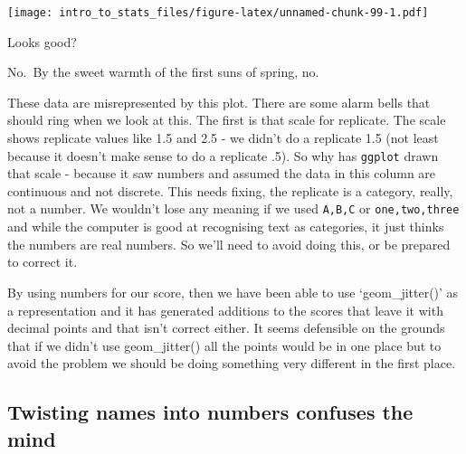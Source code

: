 \documentclass[
]{book}
\newenvironment{Shaded}{\begin{snugshade}}{\end{snugshade}}
\newcommand{\DataTypeTok}[1]{\textcolor[rgb]{0.13,0.29,0.53}{#1}}
\newcommand{\KeywordTok}[1]{\textcolor[rgb]{0.13,0.29,0.53}{\textbf{#1}}}
\newcommand{\NormalTok}[1]{#1}
\newcommand{\OperatorTok}[1]{\textcolor[rgb]{0.81,0.36,0.00}{\textbf{#1}}}
\newcommand{\StringTok}[1]{\textcolor[rgb]{0.31,0.60,0.02}{#1}}
\newenvironment{sidenote}
{ \begin{tcolorbox}[colbacktitle=blue!50!white,
title=huh?,coltitle=white,
fonttitle=\bfseries] }
{  \end{tcolorbox} }
\begin{document}
\begin{Shaded}
\end{Shaded}

\texttt{[image: intro\_to\_stats\_files/figure-latex/unnamed-chunk-99-1.pdf]}

Looks good?

No.~By the sweet warmth of the first suns of spring, no.

These data are misrepresented by this plot. There are some alarm bells that should ring when we look at this. The first is that scale for replicate. The scale shows replicate values like 1.5 and 2.5 - we didn't do a replicate 1.5 (not least because it doesn't make sense to do a replicate .5). So why has \texttt{ggplot} drawn that scale - because it saw numbers and assumed the data in this column are continuous and not discrete. This needs fixing, the replicate is a category, really, not a number. We wouldn't lose any meaning if we used \texttt{A,B,C} or \texttt{one,two,three} and while the computer is good at recognising text as categories, it just thinks the numbers are real numbers. So we'll need to avoid doing this, or be prepared to correct it.

\begin{sidenote}
By using numbers for our score, then we have been able to use `geom\_jitter()' as a representation and it has generated additions to the scores that leave it with decimal points and that isn't correct either. It seems defensible on the grounds that if we didn't use geom\_jitter() all the points would be in one place but to avoid the problem we should be doing something very different in the first place.
\end{sidenote}

\hypertarget{twisting-names-into-numbers-confuses-the-mind}{%
\subsection{Twisting names into numbers confuses the mind}\label{twisting-names-into-numbers-confuses-the-mind}}
\end{document}
